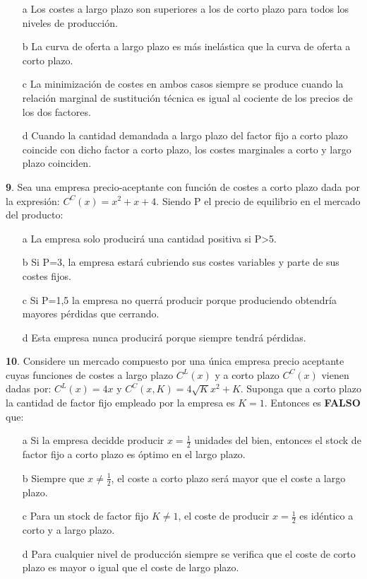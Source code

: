 \documentclass{nuevotema}
\begin{document}
\begin{enumerate}
	\item[a] Los costes a largo plazo son superiores a los de corto plazo para todos los niveles de producción.
	\item[b] La curva de oferta a largo plazo es más inelástica que la curva de oferta a corto plazo.
	\item[c] La minimización de costes en ambos casos siempre se produce cuando la relación marginal de sustitución técnica es igual al cociente de los precios de los dos factores.
	\item[d] Cuando la cantidad demandada a largo plazo del factor fijo a corto plazo coincide con dicho factor a corto plazo, los costes marginales a corto y largo plazo coinciden.
\end{enumerate}


\textbf{9}. Sea una empresa precio-aceptante con función de costes a corto plazo dada por la expresión: $C^C(x) = x^2 +x+4$. Siendo P el precio de equilibrio en el mercado del producto:

\begin{enumerate}
	\item[a] La empresa solo producirá una cantidad positiva si P>5.
	\item[b] Si P=3, la empresa estará cubriendo sus costes variables y parte de sus costes fijos.
	\item[c] Si P=1,5 la empresa no querrá producir porque produciendo obtendría mayores pérdidas que cerrando.
	\item[d] Esta empresa nunca producirá porque siempre tendrá pérdidas.
\end{enumerate}

\textbf{10}. Considere un mercado compuesto por una única empresa precio aceptante cuyas funciones de costes a largo plazo $C^L(x)$ y a corto plazo $C^C(x)$ vienen dadas por: $C^L(x) = 4x$ y $C^C(x,K)=4\sqrt{K}x^2 + K$. Suponga que a corto plazo la cantidad de factor fijo empleado por la empresa es $K=1$. Entonces es \textbf{FALSO} que:

\begin{enumerate}
	\item[a] Si la empresa decidde producir $x=\frac{1}{2}$ unidades del bien, entonces el stock de factor fijo a corto plazo es óptimo en el largo plazo.
	\item[b] Siempre que $x \neq \frac{1}{2}$, el coste a corto plazo será mayor que el coste a largo plazo.
	\item[c] Para un stock de factor fijo $K \neq 1$, el coste de producir $x=\frac{1}{2}$ es idéntico a corto y a largo plazo.
	\item[d] Para cualquier nivel de producción siempre se verifica que el coste de corto plazo es mayor o igual que el coste de largo plazo.
\end{enumerate}
\end{document}
